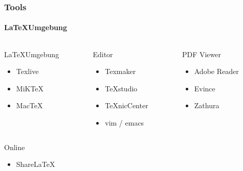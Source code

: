 \begin{frame}
    \frametitle{Tools}
    \framesubtitle{\LaTeX Umgebung}
    \begin{columns}
        \begin{column}{0.33\textwidth}
            \begin{block}{\LaTeX Umgebung}
                \begin{itemize}
                    \item Texlive
                    \item MiKTeX
                    \item MacTeX
                \end{itemize}
            \end{block}
        \end{column}
        \pause
        \begin{column}{0.33\textwidth}
            \begin{block}{Editor}
                \begin{itemize}
                    \item Texmaker
                    \item TeXstudio
                    \item TeXnicCenter
                    \item vim / emacs
                \end{itemize}
            \end{block}
        \end{column}
        \pause
        \begin{column}{0.33\textwidth}
            \begin{block}{PDF Viewer}
                \begin{itemize}
                    \item Adobe Reader
                    \item Evince
                    \item Zathura
                \end{itemize}
            \end{block}
        \end{column}
    \end{columns}
    \pause
    \begin{block}{Online}
        \begin{itemize}
            \item ShareLaTeX
        \end{itemize}
    \end{block}
\end{frame}
